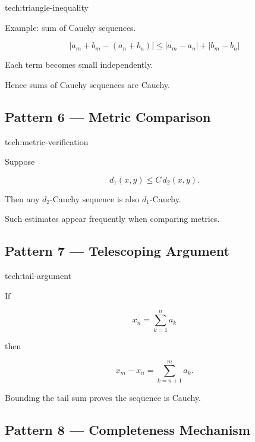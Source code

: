 \begin{remark*}[Techniques]
tech:triangle-inequality
\end{remark*}

Example: sum of Cauchy sequences.

\[
|a_m+b_m-(a_n+b_n)|
\le
|a_m-a_n|+|b_m-b_n|
\]

Each term becomes small independently.

Hence sums of Cauchy sequences are Cauchy.

\subsection*{Pattern 6 — Metric Comparison}

\begin{remark*}[Techniques]
tech:metric-verification
\end{remark*}

Suppose

\[
d_1(x,y) \le C\, d_2(x,y).
\]

Then any \(d_2\)-Cauchy sequence is also \(d_1\)-Cauchy.

Such estimates appear frequently when comparing metrics.

\subsection*{Pattern 7 — Telescoping Argument}

\begin{remark*}[Techniques]
tech:tail-argument
\end{remark*}

If

\[
x_n = \sum_{k=1}^{n} a_k
\]

then

\[
x_m-x_n
=
\sum_{k=n+1}^{m} a_k.
\]

Bounding the tail sum proves the sequence is Cauchy.

\subsection*{Pattern 8 — Completeness Mechanism}

